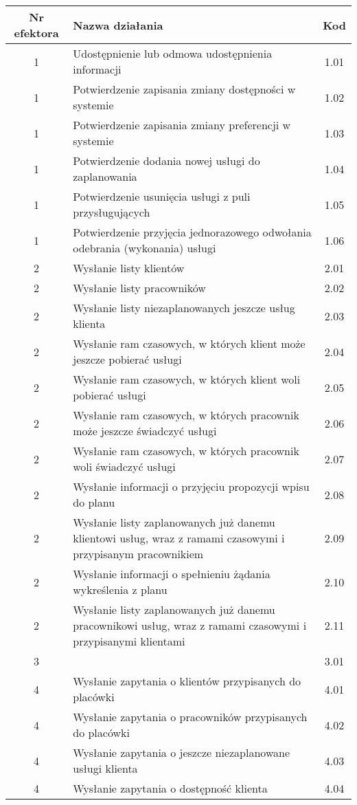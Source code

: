 \begin{tabular}{c|p{5cm}|c}
Nr efektora & Nazwa działania & Kod\\
\hline
1 & Udostępnienie lub odmowa udostępnienia informacji & 1.01\\
1 & Potwierdzenie zapisania zmiany dostępności w systemie & 1.02\\
1 & Potwierdzenie zapisania zmiany preferencji w systemie & 1.03\\
1 & Potwierdzenie dodania nowej usługi do zaplanowania & 1.04\\
1 & Potwierdzenie usunięcia usługi z puli przysługujących & 1.05\\
1 & Potwierdzenie przyjęcia jednorazowego odwołania odebrania (wykonania) usługi & 1.06\\
\hline
2 & Wysłanie listy klientów & 2.01\\
2 & Wysłanie listy pracowników & 2.02\\
2 & Wysłanie listy niezaplanowanych jeszcze usług klienta & 2.03\\
2 & Wysłanie ram czasowych, w których klient może jeszcze pobierać usługi & 2.04\\
2 & Wysłanie ram czasowych, w których klient woli pobierać usługi & 2.05 \\
2 & Wysłanie ram czasowych, w których pracownik może jeszcze świadczyć usługi & 2.06 \\
2 & Wysłanie ram czasowych, w których pracownik woli świadczyć usługi & 2.07\\
2 & Wysłanie informacji o przyjęciu propozycji wpisu do planu & 2.08\\
2 & Wysłanie listy zaplanowanych już danemu klientowi usług, wraz z ramami czasowymi i przypisanym pracownikiem & 2.09\\
2 & Wysłanie informacji o spełnieniu żądania wykreślenia z planu & 2.10\\
2 & Wysłanie listy zaplanowanych już danemu pracownikowi usług, wraz z ramami czasowymi i przypisanymi klientami & 2.11\\
\hline
3 & 	 & 3.01\\
\hline
4 & Wysłanie zapytania o klientów przypisanych do placówki & 4.01\\
4 & Wysłanie zapytania o pracowników przypisanych do placówki & 4.02\\
4 & Wysłanie zapytania o jeszcze niezaplanowane usługi klienta & 4.03\\
4 & Wysłanie zapytania o dostępność klienta & 4.04\\

\end{tabular}
